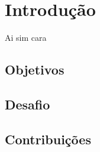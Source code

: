 \chapter{Introdução}
Ai sim cara \cite{greenwade93}
\section{Objetivos}
\section{Desafio}
\section{Contribuições}